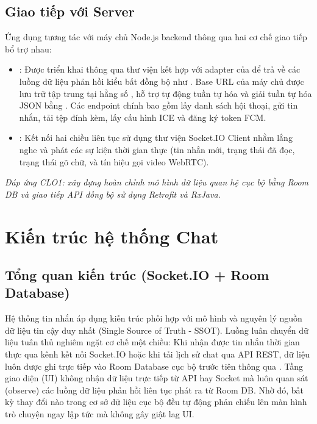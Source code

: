 \subsection{Giao tiếp với Server}
Ứng dụng tương tác với máy chủ Node.js backend thông qua hai cơ chế giao tiếp bổ trợ nhau:
\begin{itemize}
    \item {}: Được triển khai thông qua thư viện  kết hợp với adapter của  để trả về các luồng dữ liệu phản hồi kiểu bất đồng bộ như . Base URL của máy chủ được lưu trữ tập trung tại hằng số , hỗ trợ tự động tuần tự hóa và giải tuần tự hóa JSON bằng . Các endpoint chính bao gồm lấy danh sách hội thoại, gửi tin nhắn, tải tệp đính kèm, lấy cấu hình ICE và đăng ký token FCM.
    \item {}: Kết nối hai chiều liên tục sử dụng thư viện Socket.IO Client nhằm lắng nghe và phát các sự kiện thời gian thực (tin nhắn mới, trạng thái đã đọc, trạng thái gõ chữ, và tín hiệu gọi video WebRTC).
\end{itemize}

\textit{Đáp ứng CLO1: xây dựng hoàn chỉnh mô hình dữ liệu quan hệ cục bộ bằng Room DB và giao tiếp API đồng bộ sử dụng Retrofit và RxJava.}


\section{Kiến trúc hệ thống Chat}

\subsection{Tổng quan kiến trúc (Socket.IO + Room Database)}
Hệ thống tin nhắn áp dụng kiến trúc  phối hợp với mô hình  và nguyên lý nguồn dữ liệu tin cậy duy nhất (Single Source of Truth - SSOT). Luồng luân chuyển dữ liệu tuân thủ nghiêm ngặt cơ chế một chiều:
Khi nhận được tin nhắn thời gian thực qua kênh kết nối Socket.IO hoặc khi tải lịch sử chat qua API REST, dữ liệu luôn được ghi trực tiếp vào Room Database cục bộ trước tiên thông qua . Tầng giao diện (UI) không nhận dữ liệu trực tiếp từ API hay Socket mà luôn quan sát (observe) các luồng dữ liệu phản hồi liên tục  phát ra từ Room DB. Nhờ đó, bất kỳ thay đổi nào trong cơ sở dữ liệu cục bộ đều tự động phản chiếu lên màn hình trò chuyện ngay lập tức mà không gây giật lag UI.


